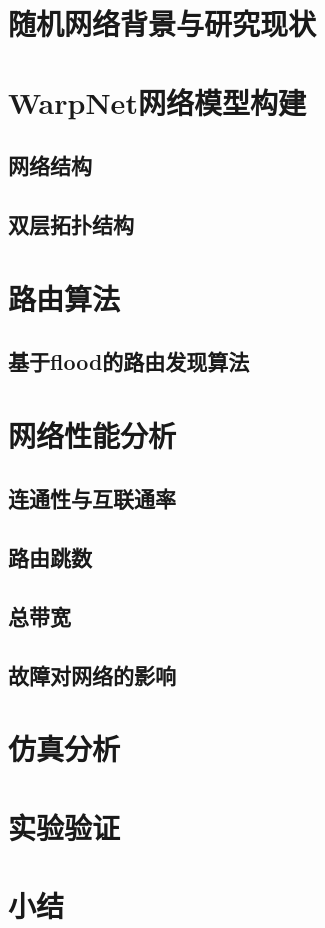 \documentclass[master]{njuthesis}
\begin{document}
\section{随机网络背景与研究现状}
\Blindtext
\section{WarpNet网络模型构建}\label{sec:warpnet_construction}
\subsection{网络结构}
\Blindtext
\subsection{双层拓扑结构}
\Blindtext
\section{路由算法}
\subsection{基于flood的路由发现算法}
\Blindtext
\section{网络性能分析}
\blindtext
\subsection{连通性与互联通率}
\Blindtext
\subsection{路由跳数}
\Blindtext
\subsection{总带宽}
\Blindtext
\subsection{故障对网络的影响}
\Blindtext
\section{仿真分析}
\Blindtext
\section{实验验证}
\Blindtext
\section{小结}
\blindtext
\end{document}
